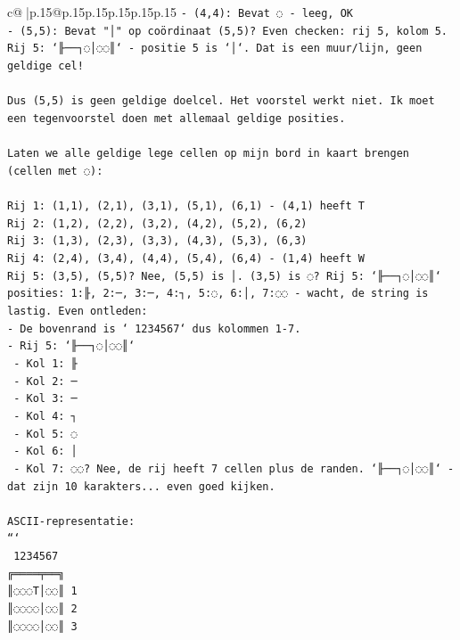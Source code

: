 \documentclass{article}
\begin{document}
{\begin{supertabular}{c@{$\;$}|p{.15\linewidth}@{}p{.15\linewidth}p{.15\linewidth}p{.15\linewidth}p{.15\linewidth}p{.15\linewidth}}
{{{\texttt{{-} (4,4): Bevat ◌ {-} leeg, OK} \\
\texttt{{-} (5,5): Bevat "│" op coördinaat (5,5)? Even checken: rij 5, kolom 5. Rij 5: `╟──┐◌│◌◌║` {-} positie 5 is `│`. Dat is een muur/lijn, geen geldige cel!} \\
\\ 
\texttt{Dus (5,5) is geen geldige doelcel. Het voorstel werkt niet. Ik moet een tegenvoorstel doen met allemaal geldige posities.} \\
\\ 
\texttt{Laten we alle geldige lege cellen op mijn bord in kaart brengen (cellen met ◌):} \\
\\ 
\texttt{Rij 1: (1,1), (2,1), (3,1), (5,1), (6,1) {-} (4,1) heeft T} \\
\texttt{Rij 2: (1,2), (2,2), (3,2), (4,2), (5,2), (6,2)} \\
\texttt{Rij 3: (1,3), (2,3), (3,3), (4,3), (5,3), (6,3)} \\
\texttt{Rij 4: (2,4), (3,4), (4,4), (5,4), (6,4) {-} (1,4) heeft W} \\
\texttt{Rij 5: (3,5), (5,5)? Nee, (5,5) is │. (3,5) is ◌? Rij 5: `╟──┐◌│◌◌║` posities: 1:╟, 2:─, 3:─, 4:┐, 5:◌, 6:│, 7:◌◌ {-} wacht, de string is lastig. Even ontleden:} \\
\texttt{{-} De bovenrand is ` 1234567` dus kolommen 1{-}7.} \\
\texttt{{-} Rij 5: `╟──┐◌│◌◌║` } \\
\texttt{  {-} Kol 1: ╟} \\
\texttt{  {-} Kol 2: ─} \\
\texttt{  {-} Kol 3: ─} \\
\texttt{  {-} Kol 4: ┐} \\
\texttt{  {-} Kol 5: ◌} \\
\texttt{  {-} Kol 6: │} \\
\texttt{  {-} Kol 7: ◌◌? Nee, de rij heeft 7 cellen plus de randen. `╟──┐◌│◌◌║` {-} dat zijn 10 karakters... even goed kijken.} \\
\\ 
\texttt{ASCII{-}representatie:} \\
\texttt{```} \\
\texttt{ 1234567} \\
\texttt{╔════╤══╗} \\
\texttt{║◌◌◌T│◌◌║ 1} \\
\texttt{║◌◌◌◌│◌◌║ 2} \\
\texttt{║◌◌◌◌│◌◌║ 3} \\
}}}
\end{supertabular}}
\end{document}
